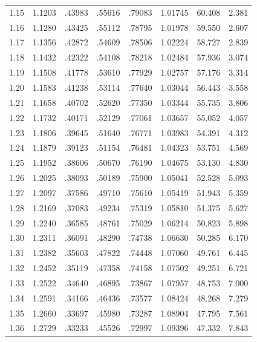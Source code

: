 \begin{minipage}{0.49\textwidth}
{\begin{tabular}{c|c|c|c|c|c|c|c}
        1.15 & 1.1203 & .43983 & .55616 & .79083 & 1.01745 & 60.408 & 2.381 \\
        1.16 & 1.1280 & .43425 & .55112 & .78795 & 1.01978 & 59.550 & 2.607 \\
        1.17 & 1.1356 & .42872 & .54609 & .78506 & 1.02224 & 58.727 & 2.839 \\
        1.18 & 1.1432 & .42322 & .54108 & .78218 & 1.02484 & 57.936 & 3.074 \\
        1.19 & 1.1508 & .41778 & .53610 & .77929 & 1.02757 & 57.176 & 3.314 \\
        1.20 & 1.1583 & .41238 & .53114 & .77640 & 1.03044 & 56.443 & 3.558 \\
        1.21 & 1.1658 & .40702 & .52620 & .77350 & 1.03344 & 55.735 & 3.806 \\
        1.22 & 1.1732 & .40171 & .52129 & .77061 & 1.03657 & 55.052 & 4.057 \\
        1.23 & 1.1806 & .39645 & .51640 & .76771 & 1.03983 & 54.391 & 4.312 \\
        1.24 & 1.1879 & .39123 & .51154 & .76481 & 1.04323 & 53.751 & 4.569 \\
        1.25 & 1.1952 & .38606 & .50670 & .76190 & 1.04675 & 53.130 & 4.830 \\
        1.26 & 1.2025 & .38093 & .50189 & .75900 & 1.05041 & 52.528 & 5.093 \\
        1.27 & 1.2097 & .37586 & .49710 & .75610 & 1.05419 & 51.943 & 5.359 \\
        1.28 & 1.2169 & .37083 & .49234 & .75319 & 1.05810 & 51.375 & 5.627 \\
        1.29 & 1.2240 & .36585 & .48761 & .75029 & 1.06214 & 50.823 & 5.898 \\
        1.30 & 1.2311 & .36091 & .48290 & .74738 & 1.06630 & 50.285 & 6.170 \\
        1.31 & 1.2382 & .35603 & .47822 & .74448 & 1.07060 & 49.761 & 6.445 \\ \arrayrulecolor{Mulberry}\hline\arrayrulecolor{black}
        1.32 & 1.2452 & .35119 & .47358 & .74158 & 1.07502 & 49.251 & 6.721 \\
        1.33 & 1.2522 & .34640 & .46895 & .73867 & 1.07957 & 48.753 & 7.000 \\
        1.34 & 1.2591 & .34166 & .46436 & .73577 & 1.08424 & 48.268 & 7.279 \\
        1.35 & 1.2660 & .33697 & .45980 & .73287 & 1.08904 & 47.795 & 7.561 \\
        1.36 & 1.2729 & .33233 & .45526 & .72997 & 1.09396 & 47.332 & 7.843 \\

\end{tabular}}
\end{minipage}
